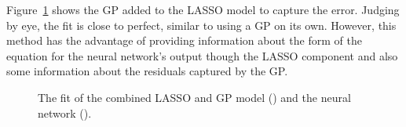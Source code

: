 Figure~\ref{fig:combined-fit} shows the \ac{GP} added to the \ac{LASSO} model to capture the error.
Judging by eye, the fit is close to perfect, similar to using a \ac{GP} on its own.
However, this method has the advantage of providing information about the form of the equation for the neural network's output though the \ac{LASSO} component and also some information about the residuals captured by the \ac{GP}.

\begin{figure}[htbp]
	\centering
	
	\caption{The fit of the combined \ac{LASSO} and \ac{GP} model (\combinedcolour) and the neural network (\nncolour).}
	\label{fig:combined-fit}
\end{figure}
